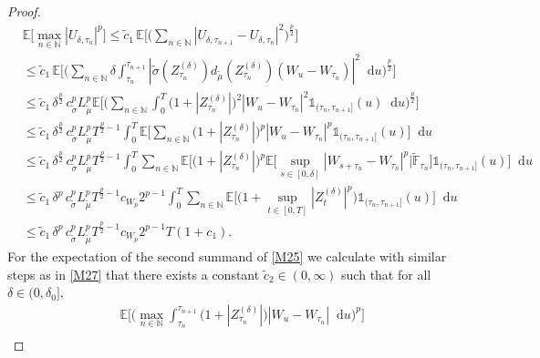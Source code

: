 \documentclass[10pt,a4paper]{amsart}
\newcommand{\E}{{\mathbb{E}}}
\newcommand{\N}{{\mathbb{N}}}
\newcommand{\diff}{\mathop{}\!\mathrm{d}}
\begin{document}
\begin{proof}
\begin{equation}
\begin{aligned}
        &\E\Big[\max_{n\in\N} |U_{\delta,\tau_n}|^p\Big] 
        \leq \widetilde c_1\, \E\Big[\Big( \sum_{n\in\N} |U_{\delta, \tau_{n+1}}- U_{\delta, \tau_n}|^2\Big)^{\frac{p}{2}}\Big] \\
        &\leq \widetilde c_1\, \E\Big[\Big( \sum_{n\in\N} \delta \int_{\tau_n}^{\tau_{n+1}} | \widetilde\sigma(Z^{(\delta)}_{\tau_n}) d_{\widetilde\mu}(Z^{(\delta)}_{\tau_n})(W_u - W_{\tau_n}) |^2 \diff u\Big)^{\frac{p}{2}}\Big] \\
        &\leq \widetilde c_1\,\delta^{\frac{p}{2}}\, c_{\widetilde\sigma}^{p} L_{\widetilde\mu}^{p} \E\Big[\Big( \sum_{n\in\N}  \int_{0}^{T} \big(1+|Z^{(\delta)}_{\tau_n}|\big)^2 |W_u - W_{\tau_n}|^2 \mathds{1}_{(\tau_n,\tau_{n+1}]} (u) \diff u\Big)^{\frac{p}{2}}\Big] \\
        &\leq \widetilde c_1\,\delta^{\frac{p}{2}}\, c_{\widetilde\sigma}^{p} L_{\widetilde\mu}^{p} T^{\frac{p}{2}-1} \int_{0}^{T} \E\Big[\sum_{n\in\N}   \big(1+|Z^{(\delta)}_{\tau_n}|\big)^p |W_u - W_{\tau_n}|^p \mathds{1}_{(\tau_n,\tau_{n+1}]} (u) \Big] \diff u\\
        &\leq \widetilde c_1\,\delta^{\frac{p}{2}}\, c_{\widetilde\sigma}^{p} L_{\widetilde\mu}^{p} T^{\frac{p}{2}-1} \int_{0}^{T} \sum_{n\in\N} \E\Big[   \big(1+|Z^{(\delta)}_{\tau_n}|\big)^p \E\big[ \sup_{s\in[0,\delta]} |W_{s+\tau_n} - W_{\tau_n}|^p \big| \widetilde{\mathbb{F}}_{\tau_n} \big] \mathds{1}_{(\tau_n,\tau_{n+1}]} (u) \Big] \diff u\\
        &\leq \widetilde c_1\,\delta^{p}\, c_{\widetilde\sigma}^{p} L_{\widetilde\mu}^{p} T^{\frac{p}{2}-1} c_{W_p} 2^{p-1} \int_{0}^{T}  \sum_{n\in\N} \E\Big[   \big(1+\sup_{t\in[0,T]}|Z^{(\delta)}_{t}|^p\big) \mathds{1}_{(\tau_n,\tau_{n+1}]} (u) \Big] \diff u\\
        &\leq \widetilde c_1\,\delta^{p}\, c_{\widetilde\sigma}^{p} L_{\widetilde\mu}^{p} T^{\frac{p}{2}-1} c_{W_p} 2^{p-1} T(1+c_1).
        \end{aligned}
    \end{equation}
    For the expectation of the second summand of \eqref{M25} we calculate with similar steps as in \eqref{M27} that there exists a constant $\widetilde c_2\in(0,\infty)$ such that for all $\delta\in(0,\delta_0]$,
    \begin{equation}\label{M29}
        \begin{aligned}
        & \E\Big[\Big( \max_{n\in\N} \int_{\tau_n}^{\tau_{n+1}} \big( 1 +  |Z^{(\delta)}_{\tau_n}|\big)|W_u-W_{\tau_n}| \diff u \Big)^p\Big]\\

\end{aligned}
\end{equation}
\end{proof}
\end{document}
